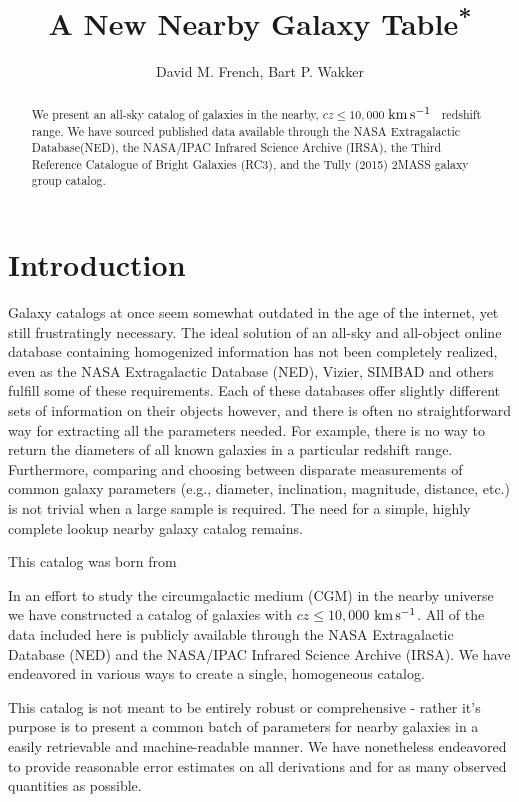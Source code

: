 \documentclass[iop]{emulateapj-rtx4}
\newcommand{\kms}{$\rm km\, s^{-1}$}
\begin{document}
\title{A New Nearby Galaxy Table\textsuperscript{*}}

\author{David M. French, Bart P. Wakker}



\begin{abstract}

We present an all-sky catalog of galaxies in the nearby, $cz \leq 10,000$ \kms~ redshift range. We have sourced published data available through the NASA Extragalactic Database(NED), the NASA/IPAC Infrared Science Archive (IRSA), the Third Reference Catalogue of Bright Galaxies (RC3), and the Tully (2015) 2MASS galaxy group catalog. 

\end{abstract}


\section{Introduction}
Galaxy catalogs at once seem somewhat outdated in the age of the internet, yet still frustratingly necessary. The ideal solution of an all-sky and all-object online database containing homogenized information has not been completely realized, even as the NASA Extragalactic Database (NED), Vizier, SIMBAD and others fulfill some of these requirements. Each of these databases offer slightly different sets of information on their objects however, and there is often no straightforward way for extracting all the parameters needed. For example, there is no way to return the diameters of all known galaxies in a particular redshift range. Furthermore, comparing and choosing between disparate measurements of common galaxy parameters (e.g., diameter, inclination, magnitude, distance, etc.) is not trivial when a large sample is required. The need for a simple, highly complete lookup nearby galaxy catalog remains.

This catalog was born from 

In an effort to study the circumgalactic medium (CGM) in the nearby universe we have constructed a catalog of galaxies with $cz \leq 10,000$ \kms. All of the data included here is publicly available through the NASA Extragalactic Database (NED) and the NASA/IPAC Infrared Science Archive (IRSA). We have endeavored in various ways to create a single, homogeneous catalog. 

This catalog is not meant to be entirely robust or comprehensive - rather it's purpose is to present a common batch of parameters for nearby galaxies in a easily retrievable and machine-readable manner. We have nonetheless endeavored to provide reasonable error estimates on all derivations and for as many observed quantities as possible.
\end{document}
